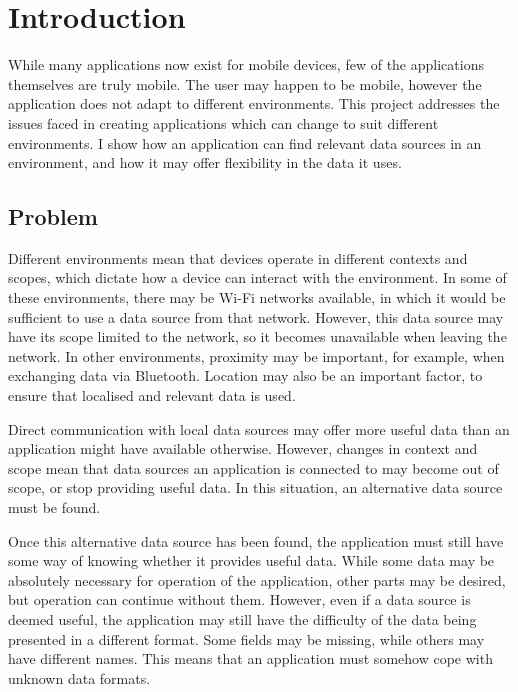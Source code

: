 \documentclass[12pt,twoside,notitlepage]{report}
\begin{document}
\tableofcontents

\listoffigures

\newpage


\cleardoublepage        %

\setcounter{page}{1}
\pagestyle{headings}

\chapter{Introduction}

While many applications now exist for mobile devices, few of the applications themselves are truly mobile. 
The user may happen to be mobile, however the application does not adapt to different environments. 
This project addresses the issues faced in creating applications which can change to suit different environments. 
I show how an application can find relevant data sources in an environment, and how it may offer flexibility in the data it uses.

\section{Problem}
Different environments mean that devices operate in different contexts and scopes, which dictate how a device can interact with the environment. 
In some of these environments, there may be Wi-Fi networks available, in which it would be sufficient to use a data source from that network. 
However, this data source may have its scope limited to the network, so it becomes unavailable when leaving the network.
In other environments, proximity may be important, for example, when exchanging data via Bluetooth. 
Location may also be an important factor, to ensure that localised and relevant data is used.

Direct communication with local data sources may offer more useful data than an application might have available otherwise. 
However, changes in context and scope mean that data sources an application is connected to may become out of scope, or stop providing useful data. 
In this situation, an alternative data source must be found.

Once this alternative data source has been found, the application must still have some way of knowing whether it provides useful data. 
While some data may be absolutely necessary for operation of the application, other parts may be desired, but operation can continue without them. 
However, even if a data source is deemed useful, the application may still have the difficulty of the data being presented in a different format. 
Some fields may be missing, while others may have different names. 
This means that an application must somehow cope with unknown data formats.
\end{document}
